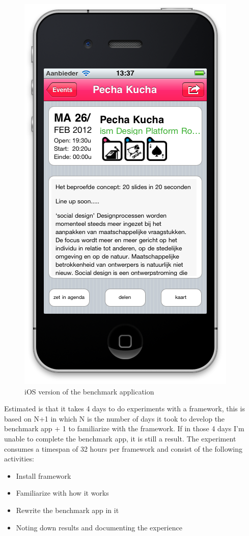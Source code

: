 \begin{figure}
\begin{minipage}{2.2in}
		\includegraphics[scale=0.15]{images/benchmarkapp02.png}
	\end{minipage}%
	\caption{iOS version of the benchmark application}%
	\label{fig:1figs}%
\end{figure}



Estimated is that it takes 4 days to do experiments with a framework, this is based on N+1 in which N is the number of days it took to develop the benchmark app + 1 to familiarize with the framework. If in those 4 days I'm unable to complete the benchmark app, it is still a result. The experiment consumes a timespan of 32 hours per framework and consist of the following activities:

\begin{itemize}
	\item Install framework
	\item Familiarize with how it works
	\item Rewrite the benchmark app in it
	\item Noting down results and documenting the experience
\end{itemize}

